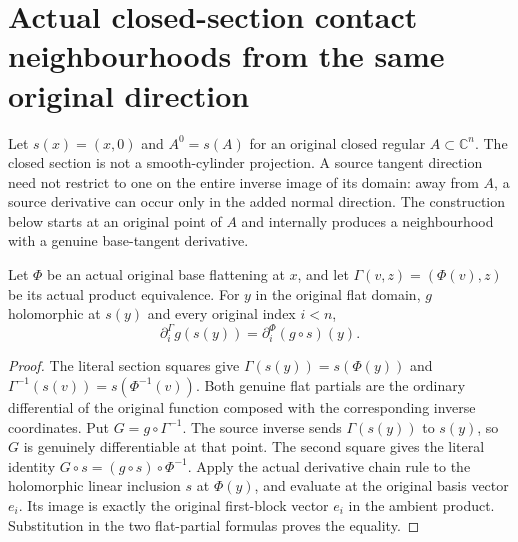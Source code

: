 \section{Actual closed-section contact neighbourhoods from the same original direction}

Let $s(x)=(x,0)$ and $A^0=s(A)$ for an original closed regular $A\subset\mathbb C^n$. The closed section is not a smooth-cylinder projection. A source tangent direction need not restrict to one on the entire inverse image of its domain: away from $A$, a source derivative can occur only in the added normal direction. The construction below starts at an original point of $A$ and internally produces a neighbourhood with a genuine base-tangent derivative.

\begin{lemma}
\label{hir:actual-zero-section-contact-product-partial}
\leanok
Let $\Phi$ be an actual original base flattening at $x$, and let $\Gamma(v,z)=(\Phi(v),z)$ be its actual product equivalence. For $y$ in the original flat domain, $g$ holomorphic at $s(y)$ and every original index $i<n$,
\[
 \partial^{\Gamma}_{i}g(s(y))=\partial_i^\Phi(g\circ s)(y).
\]
\end{lemma}
\begin{proof}
The literal section squares give $\Gamma(s(y))=s(\Phi(y))$ and $\Gamma^{-1}(s(v))=s(\Phi^{-1}(v))$. Both genuine flat partials are the ordinary differential of the original function composed with the corresponding inverse coordinates. Put $G=g\circ\Gamma^{-1}$. The source inverse sends $\Gamma(s(y))$ to $s(y)$, so $G$ is genuinely differentiable at that point. The second square gives the literal identity $G\circ s=(g\circ s)\circ\Phi^{-1}$. Apply the actual derivative chain rule to the holomorphic linear inclusion $s$ at $\Phi(y)$, and evaluate at the original basis vector $e_i$. Its image is exactly the original first-block vector $e_i$ in the ambient product. Substitution in the two flat-partial formulas proves the equality.
\end{proof}

